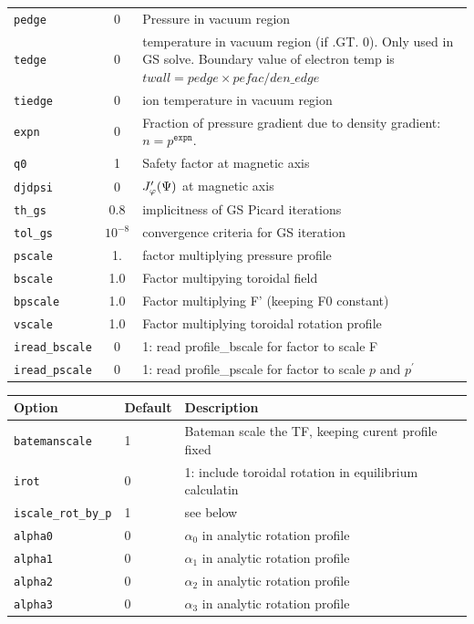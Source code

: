 \begin{tabular}{lcp{4in}}
  \texttt{pedge} & 0	  & Pressure in vacuum region\\
  \texttt{tedge} & 0     & temperature in vacuum region (if .GT. 0).  Only
                           used in GS solve.   Boundary value of electron temp
                           is $twall = pedge \times pefac/den\_edge $ \\
 \texttt{tiedge} & 0     & ion temperature in vacuum region  \\
 \texttt{expn}  & 0 & \parbox[t]{4in}{Fraction of pressure gradient due to
    density gradient: $n = p^\mathtt{expn}$.}\\
 \texttt{q0}    & 1	  & Safety factor at magnetic axis\\
 \texttt{djdpsi}& 0	  & $J_\tor'(\Psi)$ at magnetic axis\\
 \texttt{th\_gs}& 0.8     & implicitness of GS Picard iterations\\
 \texttt{tol\_gs}& $10^{-8}$  & convergence criteria for GS iteration \\
  \texttt{pscale}  & 1.       & factor multiplying pressure profile \\
  \texttt{bscale}      &  1.0 & Factor multipying toroidal field\\
  \texttt{bpscale}     &  1.0 & Factor multiplying F' (keeping F0 constant) \\
  \texttt{vscale}      &  1.0 & Factor multiplying toroidal rotation profile \\
  \texttt{iread\_bscale}&  0   & 1: read profile\_bscale for factor to scale F \\
  \texttt{iread\_pscale} & 0   & 1: read profile\_pscale for factor to scale $p$ and $p^{\prime} $ \\

\end{tabular}

\begin{tabular}{llp{4in}}
  \textbf{Option}&\textbf{Default}&\textbf{Description}\\
  \hline
  \texttt{batemanscale} &  1   & Bateman scale the TF, keeping curent profile fixed \\
  \texttt{irot}         &  0   & 1: include toroidal rotation in equilibrium calculatin \\
  \texttt{iscale\_rot\_by\_p} & 1 & see below \\
  \texttt{alpha0}       &  0   & $\alpha_0$ in analytic rotation profile \\
  \texttt{alpha1}      	&  0   & $\alpha_1$ in analytic	rotation profile \\
  \texttt{alpha2}      	&  0   & $\alpha_2$ in analytic	rotation profile \\
  \texttt{alpha3}      	&  0   & $\alpha_3$ in analytic	rotation profile \\
\end{tabular}

